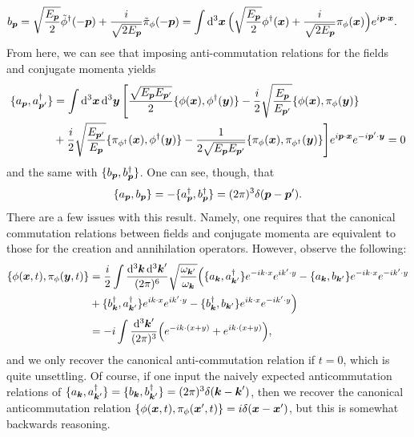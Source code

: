 {\begin{align}
    b_{\vb*{p}} &= \sqrt{\frac{E_{\vb*{p}}}{2}} \tilde{\phi}^{\dagger}(-\vb*{p}) + \frac{i}{\sqrt{2 E_{\vb*{p}}}} \tilde{\pi}_{\phi}(-\vb*{p}) = \int \dd[3]{\vb*{x}} \Big( \sqrt{\frac{E_{\vb*{p}}}{2}} \phi^{\dagger}(\vb*{x}) + \frac{i}{\sqrt{2 E_{\vb*{p}}}} \pi_{\phi}(\vb*{x}) \Big) e^{i \vb*{p} \cdot \vb*{x}}
.\end{align}
From here, we can see that imposing anti-commutation relations for the fields and conjugate momenta yields
\begin{align}
    \{ a_{\vb*{p}}, a_{\vb*{p}'}^{\dagger} \} &= \int \dd[3]{\vb*{x}} \dd[3]{\vb*{y}} \Bigg[ \frac{\sqrt{E_{\vb*{p}} E_{\vb*{p}'}}}{2} \{ \phi(\vb*{x}), \phi^{\dagger}(\vb*{y}) \} - \frac{i}{2}\sqrt{\frac{E_{\vb*{p}}}{E_{\vb*{p}'}}} \{ \phi(\vb*{x}), \pi_{\phi}(\vb*{y}) \} \nonumber \\
                                              &+ \frac{i}{2} \sqrt{\frac{E_{\vb*{p}'}}{E_{\vb*{p}}}} \{ \pi_{\phi^{\dagger}}(\vb*{x}), \phi^{\dagger}(\vb*{y}) \} - \frac{1}{2 \sqrt{E_{\vb*{p}} E_{\vb*{p}'}}} \{ \pi_{\phi}(\vb*{x}), \pi_{\phi^{\dagger}}(\vb*{y}) \} \Bigg] e^{i \vb*{p} \cdot \vb*{x}} e^{-i \vb*{p}' \cdot \vb*{y}} = 0
\end{align}
and the same with $\{ b_{\vb*{p}}, b_{\vb*{p}}^{\dagger} \}$.
One can see, though, that
\begin{align}
    \{ a_{\vb*{p}}, b_{\vb*{p}} \} = - \{ a_{\vb*{p}}^{\dagger}, b_{\vb*{p}}^{\dagger} \} = (2 \pi)^3 \delta(\vb*{p} - \vb*{p}') 
.\end{align}
There are a few issues with this result.
Namely, one requires that the canonical commutation relations between fields and conjugate momenta are equivalent to those for the creation and annihilation operators.
However, observe the following:
\begin{align}
    \{ \phi(\vb*{x},t), \pi_{\phi}(\vb*{y},t) \} &= \frac{i}{2} \int \frac{\dd[3]{\vb*{k}} \dd[3]{\vb*{k}'}}{(2 \pi)^{6}} \sqrt{\frac{\omega_{\vb*{k}'}}{\omega_{\vb*{k}}}} \Big( \{ a_{\vb*{k}}, a_{\vb*{k}'}^{\dagger} \} e^{-ik \cdot x} e^{i k' \cdot y} - \{ a_{\vb*{k}},b_{\vb*{k}'} \} e^{-i k \cdot x} e^{-i k' \cdot y} \nonumber \\
                                                 &+ \{ b_{\vb*{k}}^{\dagger}, a_{\vb*{k}'}^{\dagger} \} e^{i k \cdot x} e^{i k' \cdot y} - \{ b_{\vb*{k}}^{\dagger}, b_{\vb*{k}'} \} e^{i k \cdot x} e^{-i k' \cdot y} \Big) \nonumber \\
                                                 &= -i \int \frac{\dd[3]{\vb*{k}'}}{(2 \pi)^3} \Big( e^{-i k \cdot (x + y)} + e^{i k \cdot ( x + y)} \Big)
,\end{align}
and we only recover the canonical anti-commutation relation if $t = 0$, which is quite unsettling.
Of course, if one input the naively expected anticommutation relations of $\{ a_{\vb*{k}}, a_{\vb*{k}'}^{\dagger} \} = \{ b_{\vb*{k}}, b_{\vb*{k}'}^{\dagger} \} = (2 \pi)^3 \delta(\vb*{k} - \vb*{k}')$, then we recover the canonical anticommutation relation $\{ \phi(\vb*{x},t), \pi_{\phi}(\vb*{x}',t) \} = i \delta(\vb*{x} - \vb*{x}')$, but this is somewhat backwards reasoning.

}
